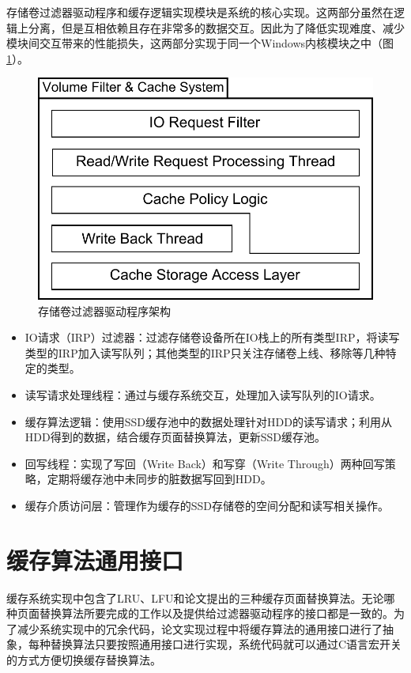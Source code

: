 存储卷过滤器驱动程序和缓存逻辑实现模块是系统的核心实现。这两部分虽然在逻辑上分离，但是互相依赖且存在非常多的数据交互。因此为了降低实现难度、减少模块间交互带来的性能损失，这两部分实现于同一个Windows内核模块之中（图\ref{fig:sys-flt-arch}）。

\begin{figure}[H]
\centering
\includegraphics[width=0.6\linewidth]{./graph/sys-flt-arch}
\caption{存储卷过滤器驱动程序架构}
\label{fig:sys-flt-arch}
\end{figure}

\begin{itemize}
\item
IO请求（IRP）过滤器：过滤存储卷设备所在IO栈上的所有类型IRP，将读写类型的IRP加入读写队列；其他类型的IRP只关注存储卷上线、移除等几种特定的类型。
\item
读写请求处理线程：通过与缓存系统交互，处理加入读写队列的IO请求。
\item
缓存算法逻辑：使用SSD缓存池中的数据处理针对HDD的读写请求；利用从HDD得到的数据，结合缓存页面替换算法，更新SSD缓存池。
\item
回写线程：实现了写回（Write Back）和写穿（Write Through）两种回写策略，定期将缓存池中未同步的脏数据写回到HDD。
\item
缓存介质访问层：管理作为缓存的SSD存储卷的空间分配和读写相关操作。
\end{itemize}


\section{缓存算法通用接口}
\label{sec:cache_interface}

缓存系统实现中包含了LRU、LFU和论文提出的三种缓存页面替换算法。无论哪种页面替换算法所要完成的工作以及提供给过滤器驱动程序的接口都是一致的。为了减少系统实现中的冗余代码，论文实现过程中将缓存算法的通用接口进行了抽象，每种替换算法只要按照通用接口进行实现，系统代码就可以通过C语言宏开关的方式方便切换缓存替换算法。

